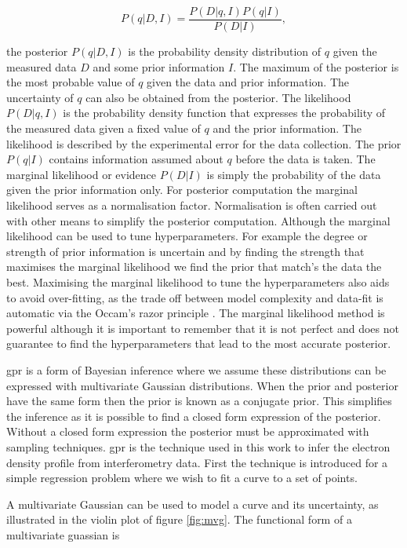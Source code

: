 \begin{equation} 
  P(q|D,I) = \frac{P(D|q,I) P(q|I)}{P(D|I)},
  \label{eq:bayesth}
\end{equation}

the posterior $P(q|D,I)$ is the probability density distribution of $q$ given the measured data $D$ and some prior information $I$. The maximum of the posterior is the most probable value of $q$ given the data and prior information. The uncertainty of $q$ can also be obtained from the posterior. The likelihood $P(D|q,I)$ is the probability density function that expresses the probability of the measured data given a fixed value of $q$ and the prior information. The likelihood is described by the experimental error for the data collection. The prior $P(q|I)$ contains information assumed about $q$ before the data is taken. The marginal likelihood or evidence $P(D|I)$ is simply the probability of the data given the prior information only. For posterior computation the marginal likelihood serves as a normalisation factor. Normalisation is often carried out with other means to simplify the posterior computation. Although the marginal likelihood can be used to tune hyperparameters. For example the degree or strength of prior information is uncertain and by finding the strength that maximises the marginal likelihood we find the prior that match's the data the best. Maximising the marginal likelihood to tune the hyperparameters also aids to avoid over-fitting, as the trade off between model complexity and data-fit is automatic via the Occam's razor principle \cite{oscraz}. The marginal likelihood method is powerful although it is important to remember that it is not perfect and does not guarantee to find the hyperparameters that lead to the most accurate posterior.

\gls{gpr} is a form of Bayesian inference where we assume these distributions can be expressed with multivariate Gaussian distributions. When the prior and posterior have the same form then the prior is known as a conjugate prior. This simplifies the inference as it is possible to find a closed form expression of the posterior. Without a closed form expression the posterior must be approximated with sampling techniques. \gls{gpr} is the technique used in this work to infer the electron density profile from interferometry data. First the technique is introduced for a simple regression problem where we wish to fit a curve to a set of points.

A multivariate Gaussian can be used to model a curve and its uncertainty, as illustrated in the violin plot of figure \ref{fig:mvg}. The functional form of a multivariate guassian is

